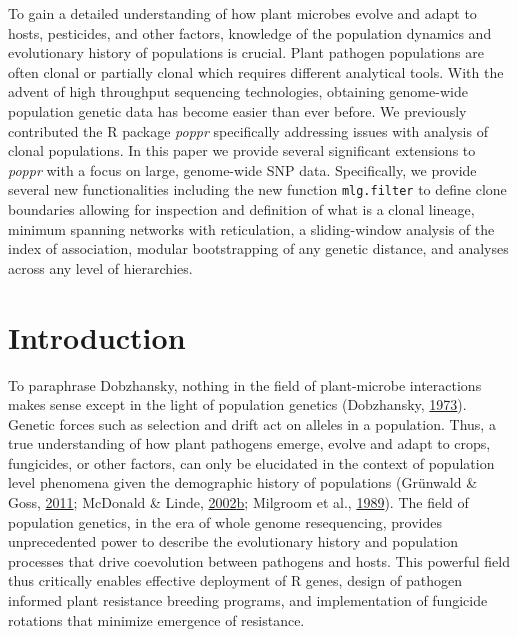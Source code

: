 \documentclass[double,11pt]{beavtex}
\begin{document}
  To gain a detailed understanding of how plant microbes evolve and adapt
  to hosts, pesticides, and other factors, knowledge of the population
  dynamics and evolutionary history of populations is crucial. Plant
  pathogen populations are often clonal or partially clonal which requires
  different analytical tools. With the advent of high throughput
  sequencing technologies, obtaining genome-wide population genetic data
  has become easier than ever before. We previously contributed the R
  package \emph{poppr} specifically addressing issues with analysis of
  clonal populations. In this paper we provide several significant
  extensions to \emph{poppr} with a focus on large, genome-wide SNP data.
  Specifically, we provide several new functionalities including the new
  function \texttt{mlg.filter} to define clone boundaries allowing for
  inspection and definition of what is a clonal lineage, minimum spanning
  networks with reticulation, a sliding-window analysis of the index of
  association, modular bootstrapping of any genetic distance, and analyses
  across any level of hierarchies.
  
  \section{Introduction}\label{introduction-2}
  
  To paraphrase Dobzhansky, nothing in the field of plant-microbe
  interactions makes sense except in the light of population genetics
  (Dobzhansky, \protect\hyperlink{ref-dobzhansky2013nothing}{1973}).
  Genetic forces such as selection and drift act on alleles in a
  population. Thus, a true understanding of how plant pathogens emerge,
  evolve and adapt to crops, fungicides, or other factors, can only be
  elucidated in the context of population level phenomena given the
  demographic history of populations (Grünwald \& Goss,
  \protect\hyperlink{ref-grunwald2011evolution}{2011}; McDonald \& Linde,
  \protect\hyperlink{ref-Mcdonald2002}{2002}\protect\hyperlink{ref-Mcdonald2002}{b};
  Milgroom et al., \protect\hyperlink{ref-milgroom1989population}{1989}).
  The field of population genetics, in the era of whole genome
  resequencing, provides unprecedented power to describe the evolutionary
  history and population processes that drive coevolution between
  pathogens and hosts. This powerful field thus critically enables
  effective deployment of R genes, design of pathogen informed plant
  resistance breeding programs, and implementation of fungicide rotations
  that minimize emergence of resistance.
  
\end{document}
